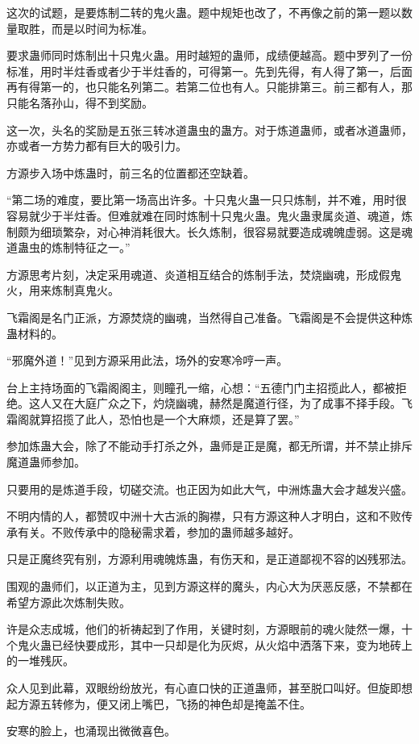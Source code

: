 \begin{this_body}
这次的试题，是要炼制二转的鬼火蛊。题中规矩也改了，不再像之前的第一题以数量取胜，而是以时间为标准。

要求蛊师同时炼制出十只鬼火蛊。用时越短的蛊师，成绩便越高。题中罗列了一份标准，用时半炷香或者少于半炷香的，可得第一。先到先得，有人得了第一，后面再有得第一的，也只能名列第二。若第二位也有人。只能排第三。前三都有人，那只能名落孙山，得不到奖励。

这一次，头名的奖励是五张三转冰道蛊虫的蛊方。对于炼道蛊师，或者冰道蛊师，亦或者一方势力都有巨大的吸引力。

方源步入场中炼蛊时，前三名的位置都还空缺着。

“第二场的难度，要比第一场高出许多。十只鬼火蛊一只只炼制，并不难，用时很容易就少于半炷香。但难就难在同时炼制十只鬼火蛊。鬼火蛊隶属炎道、魂道，炼制颇为细琐繁杂，对心神消耗很大。长久炼制，很容易就要造成魂魄虚弱。这是魂道蛊虫的炼制特征之一。”

方源思考片刻，决定采用魂道、炎道相互结合的炼制手法，焚烧幽魂，形成假鬼火，用来炼制真鬼火。

飞霜阁是名门正派，方源焚烧的幽魂，当然得自己准备。飞霜阁是不会提供这种炼蛊材料的。

“邪魔外道！”见到方源采用此法，场外的安寒冷哼一声。

台上主持场面的飞霜阁阁主，则瞳孔一缩，心想：“五德门门主招揽此人，都被拒绝。这人又在大庭广众之下，灼烧幽魂，赫然是魔道行径，为了成事不择手段。飞霜阁就算招揽了此人，恐怕也是一个大麻烦，还是算了罢。”

参加炼蛊大会，除了不能动手打杀之外，蛊师是正是魔，都无所谓，并不禁止排斥魔道蛊师参加。

只要用的是炼道手段，切磋交流。也正因为如此大气，中洲炼蛊大会才越发兴盛。

不明内情的人，都赞叹中洲十大古派的胸襟，只有方源这种人才明白，这和不败传承有关。不败传承中的隐秘需求着，参加的蛊师越多越好。

只是正魔终究有别，方源利用魂魄炼蛊，有伤天和，是正道鄙视不容的凶残邪法。

围观的蛊师们，以正道为主，见到方源这样的魔头，内心大为厌恶反感，不禁都在希望方源此次炼制失败。

许是众志成城，他们的祈祷起到了作用，关键时刻，方源眼前的魂火陡然一爆，十个鬼火蛊已经快要成形，其中一只却是化为灰烬，从火焰中洒落下来，变为地砖上的一堆残灰。

众人见到此幕，双眼纷纷放光，有心直口快的正道蛊师，甚至脱口叫好。但旋即想起方源五转修为，便又闭上嘴巴，飞扬的神色却是掩盖不住。

安寒的脸上，也涌现出微微喜色。


\end{this_body}
